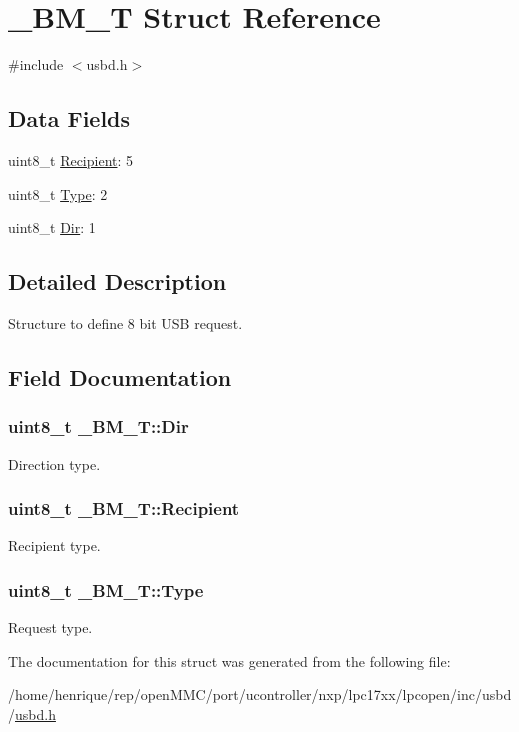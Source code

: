 \hypertarget{struct__BM__T}{\section{\-\_\-\-B\-M\-\_\-\-T Struct Reference}
\label{struct__BM__T}
}


{\ttfamily \#include $<$usbd.\-h$>$}

\subsection*{Data Fields}
\begin{DoxyCompactItemize}
\item 
uint8\-\_\-t \hyperlink{struct__BM__T_a94927112fe5f66edfe58f7b357619128}{Recipient}\-: 5
\item 
uint8\-\_\-t \hyperlink{struct__BM__T_a5fd0780bac15d2e87e04493d68941415}{Type}\-: 2
\item 
uint8\-\_\-t \hyperlink{struct__BM__T_aabd052fb91ef09c571cd697a3f2cbf3f}{Dir}\-: 1
\end{DoxyCompactItemize}


\subsection{Detailed Description}
Structure to define 8 bit U\-S\-B request. 

\subsection{Field Documentation}
\hypertarget{struct__BM__T_aabd052fb91ef09c571cd697a3f2cbf3f}{
\subsubsection[{Dir}]{\setlength{\rightskip}{0pt plus 5cm}uint8\-\_\-t \-\_\-\-B\-M\-\_\-\-T\-::\-Dir}}\label{struct__BM__T_aabd052fb91ef09c571cd697a3f2cbf3f}
Direction type. \hypertarget{struct__BM__T_a94927112fe5f66edfe58f7b357619128}{
\subsubsection[{Recipient}]{\setlength{\rightskip}{0pt plus 5cm}uint8\-\_\-t \-\_\-\-B\-M\-\_\-\-T\-::\-Recipient}}\label{struct__BM__T_a94927112fe5f66edfe58f7b357619128}
Recipient type. \hypertarget{struct__BM__T_a5fd0780bac15d2e87e04493d68941415}{
\subsubsection[{Type}]{\setlength{\rightskip}{0pt plus 5cm}uint8\-\_\-t \-\_\-\-B\-M\-\_\-\-T\-::\-Type}}\label{struct__BM__T_a5fd0780bac15d2e87e04493d68941415}
Request type. 

The documentation for this struct was generated from the following file\-:\begin{DoxyCompactItemize}
\item 
/home/henrique/rep/open\-M\-M\-C/port/ucontroller/nxp/lpc17xx/lpcopen/inc/usbd/\hyperlink{usbd_8h}{usbd.\-h}\end{DoxyCompactItemize}
